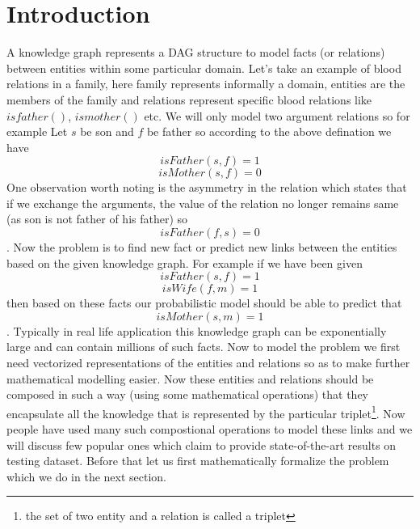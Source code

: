 \documentclass[12pt]{article}
\begin{document}
\section{Introduction}
A knowledge graph represents a DAG structure to model facts (or relations) between entities within some particular domain. Let's take an example of blood relations in a family, here family represents informally a domain, entities are the members of the family and relations represent specific blood relations like $isfather()$, $ismother()$ etc. We will only model two argument relations so for example Let $s$ be son and $f$ be father so according to the above defination we have
\[
isFather(s, f)=1
\]
\[
isMother(s, f)=0
\]One observation worth noting is the asymmetry in the relation which states that if we exchange the arguments, the value of the relation no longer remains same (as son is not father of his father) so 
\[
isFather(f, s)=0
\]
. Now the problem is to find new fact or predict new links between the entities based on the given knowledge graph. For example if we have been given 
\[
isFather(s, f)=1
\]
\[
isWife(f, m)=1
\] then based on these facts our probabilistic model should be able to predict that 
\[
isMother(s, m)=1
\]. Typically in real life application this knowledge graph can be exponentially large and can contain millions of such facts. Now to model the problem we first need vectorized representations of the entities and relations so as to make further mathematical modelling easier. Now these entities and relations should be composed in such a way (using some mathematical operations) that they encapsulate all the knowledge that is represented by the particular triplet\footnote{the set of two entity and a relation is called a triplet}. Now people have used many such compostional operations to model these links and we will discuss few popular ones which claim to provide state-of-the-art results on testing dataset. Before that let us first mathematically formalize the problem which we do in the next section. 
\end{document}
